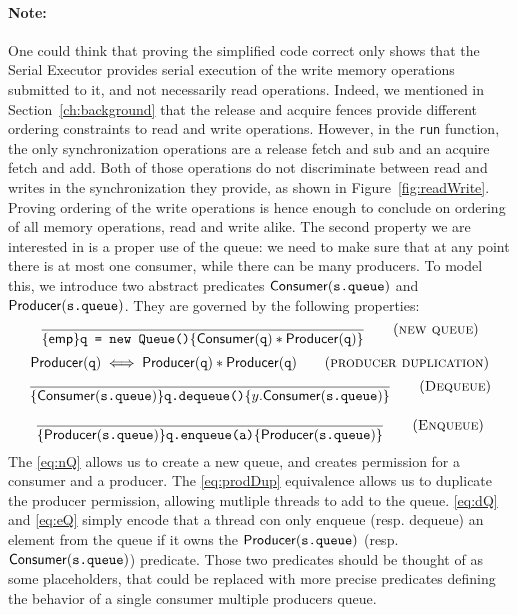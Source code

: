 \paragraph{Note:} One could think that proving the simplified code correct only shows that the Serial Executor provides serial execution of the write memory operations submitted to it, and not necessarily read operations. Indeed, we mentioned in Section~\ref{ch:background} that the release and acquire fences provide different ordering constraints to read and write operations. However, in the \texttt{run} function, the only synchronization operations are a release fetch and sub and an acquire fetch and add. Both of those operations do not discriminate between read and writes in the synchronization they provide, as shown in Figure~\ref{fig:readWrite}. Proving ordering of the write operations is hence enough to conclude on ordering of all memory operations, read and write alike.
\newline
\newline
The second property we are interested in is a proper use of the queue: we need to make sure that at any point there is at most one consumer, while there can be many producers. To model this, we introduce two abstract predicates $\mathsf{Consumer}(\texttt{s.queue})$ and $\mathsf{Producer}(\texttt{s.queue})$. They are governed by the following properties:
\begin{equation}
		\frac{}{\{\mathsf{emp}\} \texttt{q = new Queue()} \{\mathsf{Consumer}(\texttt{q}) * \mathsf{Producer}(\texttt{q})\}} 
		\tag{\textsc{new queue}} 
		\label{eq:nQ}
\end{equation}
\begin{equation}
		\mathsf{Producer}(\texttt{q}) \iff \mathsf{Producer}(\texttt{q}) * \mathsf{Producer}(\texttt{q})
		\tag{\textsc{producer duplication}} 
		\label{eq:prodDup}
\end{equation}
\begin{equation}
		\frac{}{\{\mathsf{\consQ}\} \texttt{q.dequeue()} \{y.\consQ\}} 
\tag{\textsc{Dequeue}} 
\label{eq:dQ}
\end{equation}

\begin{equation}
		\frac{}{\{\mathsf{\prodQ}\} \texttt{q.enqueue(a)} \{\prodQ\}} 
\tag{\textsc{Enqueue}} 
\label{eq:eQ}
\end{equation}
The \eqref{eq:nQ} allows us to create a new queue, and creates permission for a consumer and a producer. The \eqref{eq:prodDup} equivalence allows us to duplicate the producer permission, allowing mutliple threads to add to the queue. \eqref{eq:dQ} and \eqref{eq:eQ} simply encode that a thread con only enqueue (resp. dequeue) an element from the queue if it owns the $\mathsf{Producer}(\texttt{s.queue})$ (resp. $\mathsf{Consumer}(\texttt{s.queue})$) predicate. Those two predicates should be thought of as some placeholders, that could be replaced with more precise predicates defining the behavior of a single consumer multiple producers queue.

